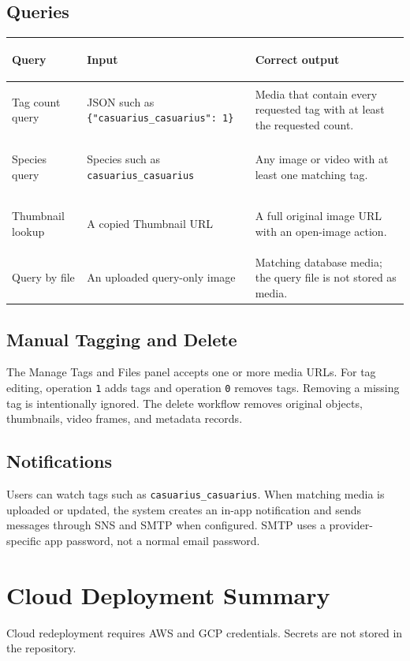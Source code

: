 \documentclass[12pt,a4paper]{article}
\begin{document}
\subsection{Queries}
\small
\begin{tabularx}{\textwidth}{>{\bfseries\raggedright\arraybackslash}p{35mm}X>{\raggedright\arraybackslash}p{48mm}}
\toprule
\textbf{Query} & \textbf{Input} & \textbf{Correct output}\\
\midrule
Tag count query & JSON such as \texttt{\{"casuarius\_casuarius": 1\}} & Media that contain every requested tag with at least the requested count.\\
Species query & Species such as \texttt{casuarius\_casuarius} & Any image or video with at least one matching tag.\\
Thumbnail lookup & A copied Thumbnail URL & A full original image URL with an open-image action.\\
Query by file & An uploaded query-only image & Matching database media; the query file is not stored as media.\\
\bottomrule
\end{tabularx}
\normalsize

\subsection{Manual Tagging and Delete}
The Manage Tags and Files panel accepts one or more media URLs. For tag editing, operation \texttt{1} adds tags and operation \texttt{0} removes tags. Removing a missing tag is intentionally ignored. The delete workflow removes original objects, thumbnails, video frames, and metadata records.

\subsection{Notifications}
Users can watch tags such as \texttt{casuarius\_casuarius}. When matching media is uploaded or updated, the system creates an in-app notification and sends messages through SNS and SMTP when configured. SMTP uses a provider-specific app password, not a normal email password.

\section{Cloud Deployment Summary}
Cloud redeployment requires AWS and GCP credentials. Secrets are not stored in the repository.
\end{document}
